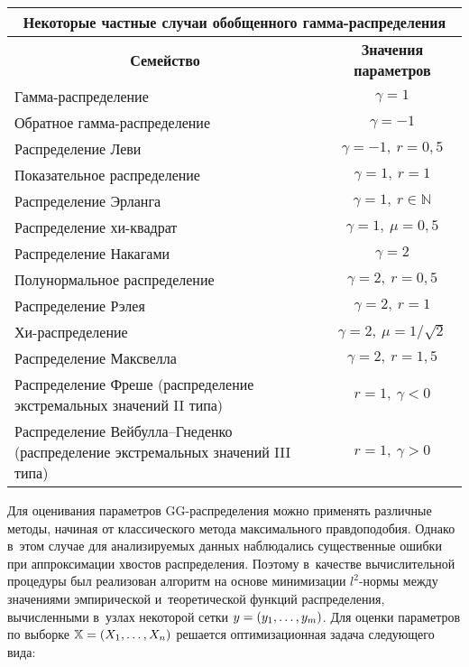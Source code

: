 \begin{multicols}{2}
\begin{table*}[b]\small
\begin{center}
\begin{tabular}{|l|c|}
\multicolumn{2}{c}{Некоторые частные случаи обобщенного гамма-распределения}\\[2ex]
\hline
\multicolumn{1}{|c|}{\bf{Семейство}} & \bf{Значения параметров} \\
\hline
Гамма-распределение & $\gamma=1$\\ 
Обратное гамма-распределение& $\gamma=-1$\\
Распределение Леви & $\gamma=-1,\ r=0{,}5$\\
Показательное распределение & $\gamma=1,\ r=1$\\
Распределение Эрланга & $\gamma=1,\ r \in \mathbb{N}$\\
Распределение хи-квадрат & $\gamma=1,\ \mu=0{,}5$\\
Распределение Накагами & $\gamma=2$\\
Полунормальное распределение & $\gamma=2,\ r=0{,}5$\\
Распределение Рэлея & $\gamma=2,\ r=1$\\
Хи-распределение & $\gamma=2,\ \mu=1/\sqrt{2}$\\
Распределение Максвелла &$\gamma=2,\ r=1{,}5$\\
Распределение Фреше (распределение экстремальных значений II типа) &$r=1,\ \gamma<0$\\
Распределение Вейбулла--Гнеденко (распределение экстремальных значений III типа)& $r=1,\ \gamma>0$\\
\hline           
\end{tabular}
\end{center}
\end{table*}

Для оценивания па\-ра\-мет\-ров GG-рас\-пре\-де\-ле\-ния мож\-но применять различные методы, 
начиная от классического метода максимального прав\-до\-по\-до\-бия. Однако в~этом 
случае для ана\-ли\-зи\-ру\-емых данных наблюдались существенные ошиб\-ки при 
ап\-прок\-си\-ма\-ции хвос\-тов распределения. Поэтому в~качестве вы\-чис\-ли\-тель\-ной процедуры 
был реализован алгоритм на основе минимизации $l^2$-но\-рмы меж\-ду значениями 
эмпирической и~тео\-ре\-ти\-че\-ской функций рас\-пре\-де\-ле\-ния, вы\-чис\-лен\-ны\-ми в~узлах 
некоторой сет\-ки $y \hm= (y_1,\ldots, y_m)$. Для оценки па\-ра\-мет\-ров по выборке 
$\mathbb{X} \hm= (X_1, \ldots, X_n)$ решается оптимизационная задача сле\-ду\-юще\-го 
\mbox{вида}:
{

}
\end{multicols}
